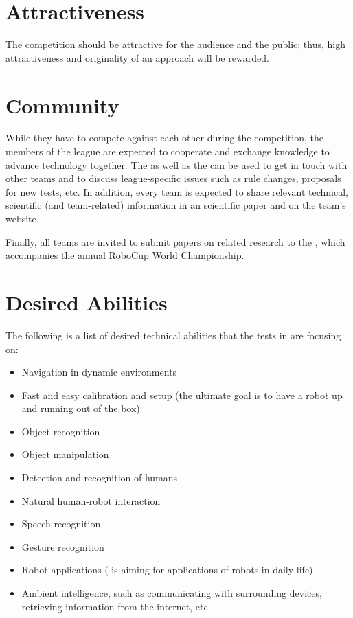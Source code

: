 \section{Attractiveness}
\label{concept:attractiveness}

The competition should be attractive for the audience and the public; thus, high attractiveness and originality of an approach will be rewarded.

\section{Community}
\label{concept:community}

While they have to compete against each other during the competition, the members of the \AtHome{} league are expected to cooperate and exchange knowledge to advance technology together.
The  as well as the \RR{} can be used to get in touch with other teams and to discuss league-specific issues such as rule changes, proposals for new tests, etc.
In addition, every team is expected to share relevant technical, scientific (and team-related) information in an scientific paper and on the team's website.

Finally, all teams are invited to submit papers on related research to the \Symp{}, which accompanies the annual RoboCup World Championship.

\section{Desired Abilities}
\label{concept:desired_abilities}

The following is a list of desired technical abilities that the tests in \AtHome{} are focusing on:

\begin{itemize}
    \item Navigation in dynamic environments
    \item Fast and easy calibration and setup (the ultimate goal is to have a robot up and running out of the box)
    \item Object recognition
    \item Object manipulation
    \item Detection and recognition of humans
    \item Natural human-robot interaction
    \item Speech recognition
    \item Gesture recognition
    \item Robot applications (\AtHome{} is aiming for applications of robots in daily life)
    \item Ambient intelligence, such as communicating with surrounding devices, retrieving information from the internet, etc.
\end{itemize}


